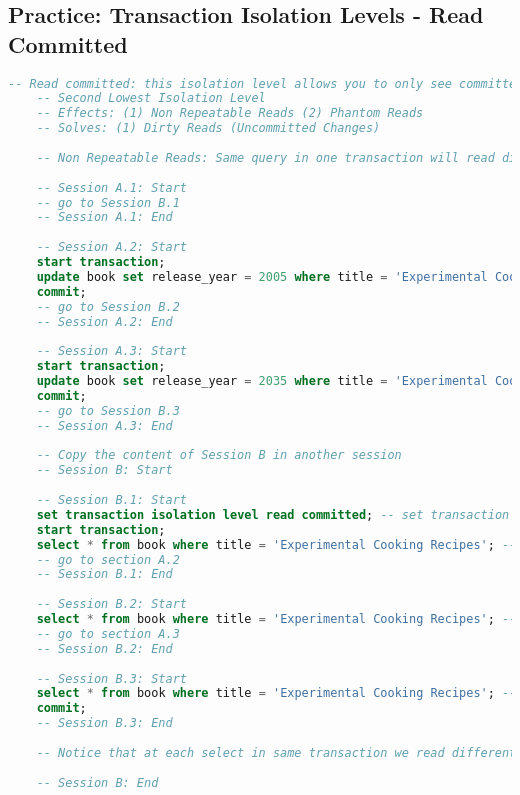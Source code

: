 \subsection{Practice: Transaction Isolation Levels - Read Committed}
\begin{lstlisting}[language=SQL]
	-- Read committed: this isolation level allows you to only see committed changes
	-- Second Lowest Isolation Level
	-- Effects: (1) Non Repeatable Reads (2) Phantom Reads
	-- Solves: (1) Dirty Reads (Uncommitted Changes)
	
	-- Non Repeatable Reads: Same query in one transaction will read different values due to changes made by a different transaction
	
	-- Session A.1: Start
	-- go to Session B.1
	-- Session A.1: End
	
	-- Session A.2: Start
	start transaction;
	update book set release_year = 2005 where title = 'Experimental Cooking Recipes';
	commit;
	-- go to Session B.2
	-- Session A.2: End
	
	-- Session A.3: Start
	start transaction;
	update book set release_year = 2035 where title = 'Experimental Cooking Recipes';
	commit;
	-- go to Session B.3
	-- Session A.3: End
	
	-- Copy the content of Session B in another session
	-- Session B: Start
	
	-- Session B.1: Start
	set transaction isolation level read committed; -- set transaction isolation level to read committed
	start transaction;
	select * from book where title = 'Experimental Cooking Recipes'; -- release year is 2015
	-- go to section A.2
	-- Session B.1: End
	
	-- Session B.2: Start
	select * from book where title = 'Experimental Cooking Recipes'; -- release year is 2005
	-- go to section A.3
	-- Session B.2: End
	
	-- Session B.3: Start
	select * from book where title = 'Experimental Cooking Recipes'; -- release year is 2035
	commit;
	-- Session B.3: End
	
	-- Notice that at each select in same transaction we read different value for release year.
	
	-- Session B: End
\end{lstlisting}
